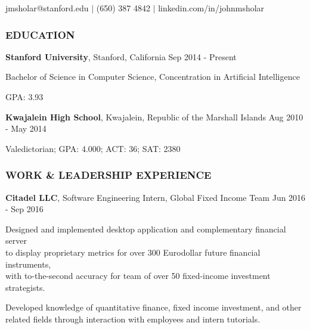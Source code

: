 \documentclass[11pt,letterpaper]{article}%
\begin{document}
\vspace{-1ex}
\centerline{jmsholar@stanford.edu $|$ (650) 387 4842 $|$ linkedin.com/in/johnmsholar}
\vspace{-1ex}

\hrulefill
\subsubsection*{EDUCATION}
\small

\hspace{.6em} 
{\bf Stanford University}, Stanford, California \hfill Sep 2014 - Present

\hspace{1.2em} 
{Bachelor of Science} in Computer Science, Concentration in Artificial Intelligence 

\hspace{1.2em} 
GPA: 3.93

\hspace{.6em} 
{\bf Kwajalein High School}, Kwajalein, Republic of the Marshall Islands \hfill Aug 2010 - May 2014

\hspace{1.2em} 
Valedictorian; GPA: 4.000; ACT: 36; SAT: 2380

\vspace{-.5em}
\hrulefill 
\subsubsection*{WORK \& LEADERSHIP EXPERIENCE}

\vspace{.3em}
\hspace{.6em} 
{\bf Citadel LLC}, Software Engineering Intern, Global Fixed Income Team \hfill Jun 2016 - Sep 2016
\vspace{-.6em}
\begin{itemize*}
\item 
Designed and implemented desktop application and complementary financial server \\ to display proprietary metrics for over 300 Eurodollar future financial instruments, \\ with to-the-second accuracy for team of over 50 fixed-income investment strategists.
\item
Developed knowledge of quantitative finance, fixed income investment, and other \\ related fields through interaction with employees and intern tutorials.
\end{itemize*}
\end{document}

